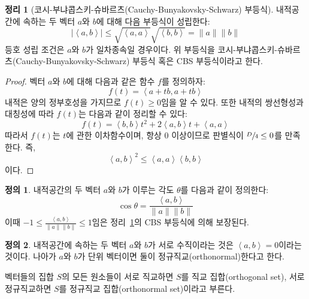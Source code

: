 \documentclass[unfonts,oneside,a4paper]{oblivoir}
\theoremstyle{definition}
\newtheorem{definition}{정의}[section]
\theoremstyle{theorem}
\newtheorem{theorem}{정리}[section]
\theoremstyle{theorem}
\theoremstyle{remark}
\theoremstyle{remark}
\theoremstyle{remark}
\theoremstyle{remark}
\renewcommand{\vec}[1]{\bm{\mathit{#1}}}
\begin{document}
\begin{theorem} [코시-부냐콥스키-슈바르츠(Cauchy-Bunyakovsky-Schwarz) 부등식] \label{thm:CBS}
    내적공간에 속하는 두 벡터 $\vec a$와 $\vec b$에 대해 다음 부등식이 성립한다:
    \begin{equation*}
        \bigl|\left<\vec a, \vec b\right>\bigr| \leq \sqrt{\left<\vec a, \vec a\right>} \sqrt{\left<\vec b, \vec b\right>} = \lVert \vec a \rVert \lVert \vec b \rVert
    \end{equation*}
    등호 성립 조건은 $\vec a$와 $\vec b$가 일차종속일 경우이다.
    위 부등식을 코시-부냐콥스키-슈바르츠(Cauchy-Bunyakovsky-Schwarz) 부등식 혹은 CBS 부등식이라고 한다.
\end{theorem}

\begin{proof}
    벡터 $\vec a$와 $\vec b$에 대해 다음과 같은 함수 $f$를 정의하자:
    \begin{equation*}
        f(t) = \left<\vec a + t \vec b, \vec a + t \vec b\right>
    \end{equation*}
    내적은 양의 정부호성을 가지므로 $f(t) \geq 0$임을 알 수 있다.
    또한 내적의 쌍선형성과 대칭성에 따라 $f(t)$는 다음과 같이 정리할 수 있다:
    \begin{equation*}
        f(t) = \left<\vec b, \vec b\right> t^2 + 2 \left<\vec a, \vec b\right> t + \left<\vec a, \vec a\right>
    \end{equation*}
    따라서 $f(t)$는 $t$에 관한 이차함수이며, 항상 0 이상이므로 판별식이 $\sfrac D4 \leq 0$를 만족한다.
    즉,
    \begin{equation*}
       \left<\vec a, \vec b\right>^2 \leq \left<\vec a, \vec a\right> \left<\vec b, \vec b\right>
    \end{equation*}
    이다.
\end{proof}

\begin{definition}
    내적공간의 두 벡터 $\vec a$와 $\vec b$가 이루는 각도 $\theta$를 다음과 같이 정의한다:
    \begin{equation*}
        \cos \theta = \frac{\left<\vec a, \vec b\right>}{\lVert \vec a\rVert \lVert \vec b \rVert}
    \end{equation*}
    이때 $-1 \leq \frac{\left<\vec a, \vec b\right>}{\lVert \vec a\rVert \lVert \vec b \rVert} \leq 1$임은 정리~\ref{thm:CBS}의 CBS 부등식에 의해 보장된다.
\end{definition}

\begin{definition}
    내적공간에 속하는 두 벡터 $\vec a$와 $\vec b$가 서로 수직이라는 것은 $\left<\vec a, \vec b\right> = 0$이라는 것이다.
    나아가 $\vec a$와 $\vec b$가 단위 벡터이면 둘이 정규직교(orthonormal)한다고 한다.

    벡터들의 집합 $S$의 모든 원소들이 서로 직교하면 $S$를 직교 집합(orthogonal set), 서로 정규직교하면 $S$를 정규직교 집합(orthonormal set)이라고 부른다.
\end{definition}
\end{document}
